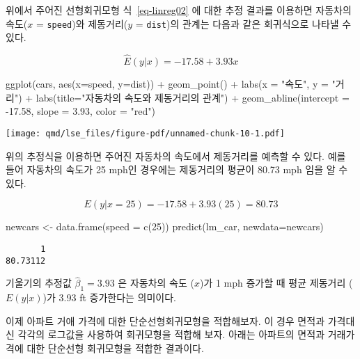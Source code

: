 \documentclass[
  11pt,
  a4paper,
  oneside]{scrbook}
\newenvironment{Shaded}{\begin{snugshade}}{\end{snugshade}}
\newcommand{\AttributeTok}[1]{\textcolor[rgb]{0.40,0.45,0.13}{#1}}
\newcommand{\DecValTok}[1]{\textcolor[rgb]{0.68,0.00,0.00}{#1}}
\newcommand{\FloatTok}[1]{\textcolor[rgb]{0.68,0.00,0.00}{#1}}
\newcommand{\FunctionTok}[1]{\textcolor[rgb]{0.28,0.35,0.67}{#1}}
\newcommand{\NormalTok}[1]{\textcolor[rgb]{0.00,0.23,0.31}{#1}}
\newcommand{\OtherTok}[1]{\textcolor[rgb]{0.00,0.23,0.31}{#1}}
\newcommand{\SpecialCharTok}[1]{\textcolor[rgb]{0.37,0.37,0.37}{#1}}
\newcommand{\StringTok}[1]{\textcolor[rgb]{0.13,0.47,0.30}{#1}}
\theoremstyle{definition}
\theoremstyle{plain}
\theoremstyle{definition}
\theoremstyle{definition}
\theoremstyle{remark}
\begin{document}
위에서 주어진 선형회귀모형 식~\ref{eq-linreg02} 에 대한 추정 결과를
이용하면 자동차의 속도(\(x\) = \texttt{speed})와 제동거리(\(y\) =
\texttt{dist})의 관계는 다음과 같은 회귀식으로 나타낼 수 있다.

\[ \hat E(y | x) = −17.58 + 3.93 x \]

\begin{Shaded}
\begin{Highlighting}[]
\FunctionTok{ggplot}\NormalTok{(cars, }\FunctionTok{aes}\NormalTok{(}\AttributeTok{x=}\NormalTok{speed, }\AttributeTok{y=}\NormalTok{dist)) }\SpecialCharTok{+} \FunctionTok{geom\_point}\NormalTok{() }\SpecialCharTok{+} \FunctionTok{labs}\NormalTok{(}\AttributeTok{x =} \StringTok{"속도"}\NormalTok{, }\AttributeTok{y =} \StringTok{"거리"}\NormalTok{) }\SpecialCharTok{+}
  \FunctionTok{labs}\NormalTok{(}\AttributeTok{title=}\StringTok{"자동차의 속도와 제동거리의 관계"}\NormalTok{) }\SpecialCharTok{+} 
  \FunctionTok{geom\_abline}\NormalTok{(}\AttributeTok{intercept =} \SpecialCharTok{{-}}\FloatTok{17.58}\NormalTok{, }\AttributeTok{slope =} \FloatTok{3.93}\NormalTok{, }\AttributeTok{color =} \StringTok{"red"}\NormalTok{)}
\end{Highlighting}
\end{Shaded}

\texttt{[image: qmd/lse\_files/figure-pdf/unnamed-chunk-10-1.pdf]}

위의 추정식을 이용하면 주어진 자동차의 속도에서 제동거리를 예측할 수
있다. 예를 들어 자동차의 속도가 25 mph인 경우에는 제동거리의 평균이
80.73 mph 임을 알 수 있다.

\[ E(y|x=25) = −17.58 + 3.93 (25) = 80.73 \]

\begin{Shaded}
\begin{Highlighting}[]
\NormalTok{newcars }\OtherTok{\textless{}{-}} \FunctionTok{data.frame}\NormalTok{(}\AttributeTok{speed =} \FunctionTok{c}\NormalTok{(}\DecValTok{25}\NormalTok{))}
\FunctionTok{predict}\NormalTok{(lm\_car, }\AttributeTok{newdata=}\NormalTok{newcars)}
\end{Highlighting}
\end{Shaded}

\begin{verbatim}
       1 
80.73112 
\end{verbatim}

기울기의 추정값 \(\hat \beta_1 = 3.93\) 은 자동차의 속도 (\(x\))가 1 mph
증가할 때 평균 제동거리 (\(E(y|x)\))가 3.93 ft 증가한다는 의미이다.

이제 아파트 거애 가격에 대한 단순선형회귀모형을 적합해보자. 이 경우
면적과 가격대신 각각의 로그값을 사용하여 회귀모형을 적합해 보자. 아래는
아파트의 면적과 거래가격에 대한 단순선형 회귀모형을 적합한 결과이다.
\end{document}
